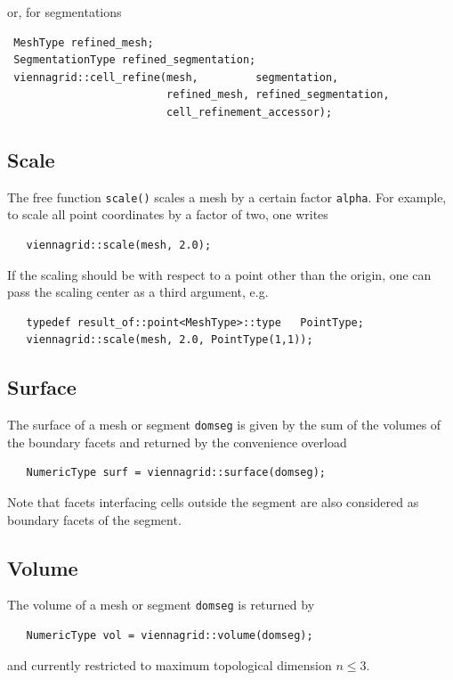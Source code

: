  \pagebreak

 or, for segmentations
 \begin{lstlisting}
 MeshType refined_mesh;
 SegmentationType refined_segmentation;
 viennagrid::cell_refine(mesh,         segmentation,
                         refined_mesh, refined_segmentation,
                         cell_refinement_accessor);
 \end{lstlisting}


 \subsection{Scale}
 The free function \lstinline|scale()| scales a mesh by a certain factor \lstinline|alpha|. For example, to scale all point coordinates by a factor of two, one writes
  \begin{lstlisting}
   viennagrid::scale(mesh, 2.0);
  \end{lstlisting}
  If the scaling should be with respect to a point other than the origin, one can pass the scaling center as a third argument, e.g.
  \begin{lstlisting}
   typedef result_of::point<MeshType>::type   PointType;
   viennagrid::scale(mesh, 2.0, PointType(1,1));
  \end{lstlisting}

 \subsection{Surface}
 The surface of a mesh or segment \lstinline|domseg| is given by the sum of the volumes of the boundary facets and returned by the convenience overload
  \begin{lstlisting}
   NumericType surf = viennagrid::surface(domseg);
  \end{lstlisting}
  Note that facets interfacing cells outside the segment are also considered as boundary facets of the segment.


  \subsection{Volume}
  The volume of a mesh or segment \lstinline|domseg| is returned by
  \begin{lstlisting}
   NumericType vol = viennagrid::volume(domseg);
  \end{lstlisting}
  and currently restricted to maximum topological dimension $n \leq 3$.



